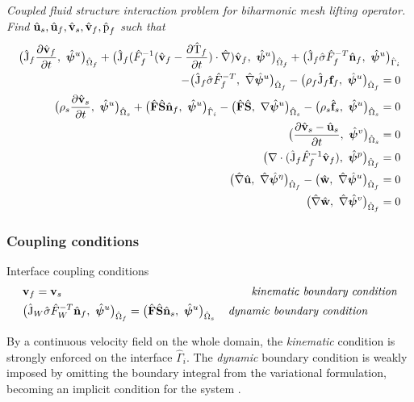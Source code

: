 \begin{prob}
\textit{Coupled fluid structure interaction problem for biharmonic mesh lifting operator.
Find $\hat{\mathbf{u}}_s, \hat{\mathbf{u}}_f, \hat{\mathbf{v}}_s, \hat{\mathbf{v}}_f, \text{\^{p}}_f $ such that}
\begin{align*}
\big(\text{\^{J}}_f \frac{\partial \hat{\mathbf{v}}_f}{\partial t}, \ \hat{\bm{\psi}}^u \big)_{\hat{\Omega}_f} +
\big(\text{\^{J}}_f (\hat{F}_f^{-1}(\hat{\mathbf{v}}_f - \frac{\partial \text{\^{T}}_f}{\partial t}) \cdot \hat{\nabla}) \hat{\mathbf{v}}_f, \ {\hat{\bm{\psi}}^u} \big)_{\hat{\Omega}_f}
+ \big(\text{\^{J}}_f \hat{\sigma}\hat{F}_f^{-T} \hat{\mathbf{n}}_f, \ {\hat{\bm{\psi}}^u} \big)_{\hat{\Gamma}_i} \\
- \big(\text{\^{J}}_f \hat{\sigma}\hat{F}_f^{-T}, \ {\hat{\nabla}\hat{\bm{\psi}}^u} \big)_{\hat{\Omega}_f} -
\big(\rho_f \text{\^{J}}_f \mathbf{f}_f, \ {{\hat{\bm{\psi}}^u}} \big)_{\hat{\Omega}_f} = 0 \\
\big(\rho_s \frac{\partial \hat{\mathbf{v}}_s}{\partial t}, \ {\hat{\bm{\psi}}^u} \big)_{\hat{\Omega}_s} + \big(\hat{\mathbf{F}}\hat{\mathbf{S}}\hat{\mathbf{n}}_f, \ {\hat{\bm{\psi}}^u} \big)_{\hat{\Gamma}_i}
- \big(\hat{\mathbf{F}}\hat{\mathbf{S}}, \ {\nabla \hat{\bm{\psi}}^u} \big)_{\hat{\Omega}_s} - \big(\rho_s \hat{\mathbf{f}}_s, \ {\hat{\bm{\psi}}^u} \big)_{\hat{\Omega}_s} = 0 \\
\big(\frac{\partial \hat{\mathbf{v}}_s - \hat{\mathbf{u}}_s}{\partial t}, \ {\hat{\bm{\psi}}^v} \big)_{\hat{\Omega}_s}  = 0\\
\big(\nabla \cdot (\text{\^{J}}_f \hat{F}_f^{-1} \hat{\mathbf{v}}_f), \ {\hat{\bm{\psi}}^p} \big)_{\hat{\Omega}_f} = 0 \\
\big(\hat{\nabla}\hat{\mathbf{u}}, \ {\hat{\nabla}\hat{\bm{\psi}}^{\eta}} \big)_{\hat{\Omega}_f} - 
\big(\hat{\mathbf{w}}, \ {\hat{\nabla}\hat{\bm{\psi}}^u} \big)_{\hat{\Omega}_f} = 0 \\
\big(\hat{\nabla}\hat{\mathbf{w}}, \ {\hat{\nabla}\hat{\bm{\psi}}^{v}} \big)_{\hat{\Omega}_f} = 0
\end{align*}
\end{prob}
\subsubsection*{Coupling conditions}
\begin{equat}
Interface coupling conditions
\begin{align*}
&\mathbf{v}_f = \mathbf{v}_s  \hspace{5.9cm} \textit{kinematic boundary condition} \\
& \femf{\ha{J}_W \hat{\sigma}\hat{F}_W^{-T} \bat{n}_f}{\gat{\psi}^u} = 
 \fems{\bat{F}\bat{S} \bat{n}_s}{\gat{\psi}^u}  \hspace{4mm} \textit{dynamic boundary condition} 
\end{align*} 
\end{equat}
By a continuous velocity field on the whole domain, the \textit{kinematic} condition is strongly enforced on the interface $\hat{\Gamma}_i$.
The \textit{dynamic} boundary condition is weakly imposed by omitting the boundary integral from the variational formulation, becoming an implicit condition for the system \cite{Wick}. \\
